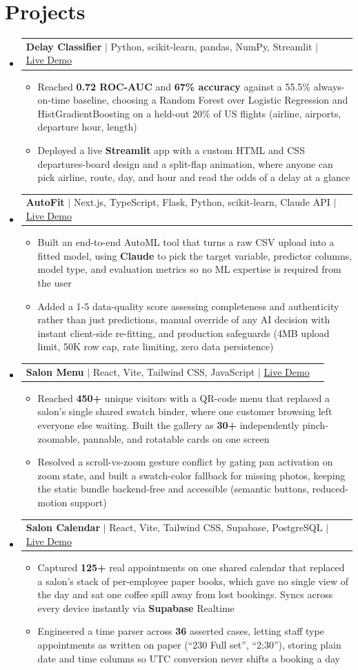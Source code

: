 \documentclass[letterpaper,10.5pt]{article}
\makeatletter
\newcommand{\resumeItem}[1]{
  \item\small{{#1 \vspace{-3pt}}}
}
\newcommand{\resumeProjectHeading}[2]{
    \item
    \begin{tabular*}{0.97\textwidth}{l@{\extracolsep{\fill}}r}
      \normalsize #1 & \normalsize #2 \\
    \end{tabular*}\vspace{-7pt}
}
\newcommand{\resumeSubHeadingListStart}{\begin{itemize}[leftmargin=0.15in, label={}]}
\newcommand{\resumeSubHeadingListEnd}{\end{itemize}}
\newcommand{\resumeItemListStart}{\begin{itemize}[leftmargin=0.15in, label=\textbullet]}
\newcommand{\resumeItemListEnd}{\end{itemize}\vspace{-5pt}}
\makeatother
\begin{document}
\section{Projects}
    \resumeSubHeadingListStart
      \resumeProjectHeading
          {\textbf{Delay Classifier} $|$ Python, scikit-learn, pandas, NumPy, Streamlit $|$ \href{https://delay-classifier.streamlit.app/}{Live Demo}}{}
          \resumeItemListStart
            \resumeItem{Reached \textbf{0.72 ROC-AUC} and \textbf{67\% accuracy} against a 55.5\% always-on-time baseline, choosing a Random Forest over Logistic Regression and HistGradientBoosting on a held-out 20\% of US flights (airline, airports, departure hour, length)}
            \resumeItem{Deployed a live \textbf{Streamlit} app with a custom HTML and CSS departures-board design and a split-flap animation, where anyone can pick airline, route, day, and hour and read the odds of a delay at a glance}
          \resumeItemListEnd
      \resumeProjectHeading
          {\textbf{AutoFit} $|$ Next.js, TypeScript, Flask, Python, scikit-learn, Claude API $|$ \href{https://auto-fit-pi.vercel.app}{Live Demo}}{}
          \resumeItemListStart
            \resumeItem{Built an end-to-end AutoML tool that turns a raw CSV upload into a fitted model, using \textbf{Claude} to pick the target variable, predictor columns, model type, and evaluation metrics so no ML expertise is required from the user}
            \resumeItem{Added a 1-5 data-quality score assessing completeness and authenticity rather than just predictions, manual override of any AI decision with instant client-side re-fitting, and production safeguards (4MB upload limit, 50K row cap, rate limiting, zero data persistence)}
          \resumeItemListEnd
      \resumeProjectHeading
          {\textbf{Salon Menu} $|$ React, Vite, Tailwind CSS, JavaScript $|$ \href{https://salon-menu-jade.vercel.app/}{Live Demo}}{}
          \resumeItemListStart
            \resumeItem{Reached \textbf{450+} unique visitors with a QR-code menu that replaced a salon's single shared swatch binder, where one customer browsing left everyone else waiting. Built the gallery as \textbf{30+} independently pinch-zoomable, pannable, and rotatable cards on one screen}
            \resumeItem{Resolved a scroll-vs-zoom gesture conflict by gating pan activation on zoom state, and built a swatch-color fallback for missing photos, keeping the static bundle backend-free and accessible (semantic buttons, reduced-motion support)}
          \resumeItemListEnd
      \resumeProjectHeading
          {\textbf{Salon Calendar} $|$ React, Vite, Tailwind CSS, Supabase, PostgreSQL $|$ \href{https://saloncalendar.vercel.app/}{Live Demo}}{}
          \resumeItemListStart
            \resumeItem{Captured \textbf{125+} real appointments on one shared calendar that replaced a salon's stack of per-employee paper books, which gave no single view of the day and sat one coffee spill away from lost bookings. Syncs across every device instantly via \textbf{Supabase} Realtime}
            \resumeItem{Engineered a time parser across \textbf{36} asserted cases, letting staff type appointments as written on paper (``230 Full set'', ``2;30''), storing plain date and time columns so UTC conversion never shifts a booking a day}
          \resumeItemListEnd
    \resumeSubHeadingListEnd
\end{document}
